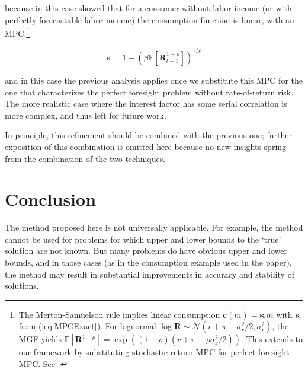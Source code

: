 \documentclass[twocolumn, switch]{article}
\newcommand{\Ex}{\mathbf{\mathbb{E}}}
\newcommand{\DiscFac}{\beta}
\newcommand{\CRRA}{\rho}
\newcommand{\mNrm}{m}
\newcommand{\cFunc}{\mathbf{c}}
\newcommand{\MPC}{\boldsymbol{\kappa}}
\newcommand{\Risky}{\mathbf{R}}
\newcommand{\Nrml}{\mathcal{N}}
\newcommand{\std}{\sigma}
\newcommand{\risky}{\mathbf{r}}
\newcommand{\equityPrem}{\pi}
\begin{document}
because in this case \citet{Samuelson1969, Merton1969, Merton1971}
showed that for a consumer without labor income (or with perfectly forecastable
labor income) the consumption function is linear, with an MPC.\footnote{The Merton-Samuelson rule implies linear consumption $\cFunc(\mNrm) = \MPC\,\mNrm$ with $\MPC$ from (\ref{eq:MPCExact}). For lognormal $\log \Risky \sim \Nrml(r+\equityPrem -\std_{\risky}^{2}/2,\std_{\risky}^{2})$, the MGF yields $\Ex[\Risky^{1 -\CRRA}] = \exp((1 -\CRRA)(r+\equityPrem - \CRRA\std_{\risky}^{2}/2))$. This extends to our framework by substituting stochastic-return MPC for perfect foresight MPC. See \citet{CRRA-RateRisk, BBZ2016SkewedWealth}.}

\begin{equation}
\label{eq:MPCExact}
\MPC = 1- \left(\DiscFac  \Ex[\Risky_{t+1}^{1-\CRRA}]\right)^{1/\CRRA}
\end{equation}

and in this case the previous analysis applies once we substitute this MPC for
the one that characterizes the perfect foresight problem without rate-of-return
risk. The more realistic case where the interest factor has some serial
correlation is more complex, and thus left for future work.

In principle, this refinement should be combined with the previous one; further
exposition of this combination is omitted here because no new insights spring
from the combination of the two techniques.

\section{Conclusion}

The method proposed here is not universally applicable. For example, the method
cannot be used for problems for which upper and lower bounds to the `true'
solution are not known. But many problems do have obvious upper and lower
bounds, and in those cases (as in the consumption example used in the paper),
the method may result in substantial improvements in accuracy and stability of
solutions.




\end{document}
